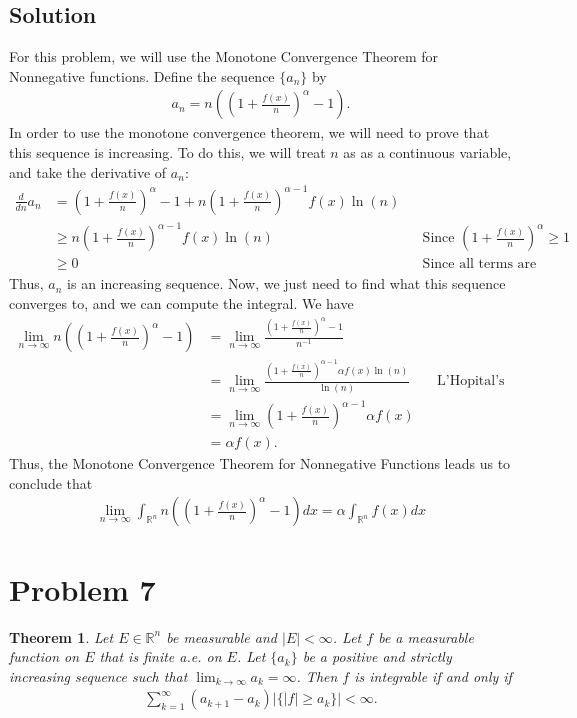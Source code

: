 \documentclass[10pt,a4paper]{article}
\theoremstyle{theorem}
\newtheorem{theorem}{Theorem}
\theoremstyle{definition}
\begin{document}
\subsection*{Solution}
For this problem, we will use the Monotone Convergence Theorem for Nonnegative functions. Define the sequence $\{a_n \}$ by
\begin{align*}
a_n = n \left( \left( 1 + \frac{f(x)}{n} \right)^ \alpha - 1 \right).
\end{align*}
In order to use the monotone convergence theorem, we will need to prove that this sequence is increasing. To do this, we will treat $n$ as as a continuous variable, and take the derivative of $a_n$:
\begin{align*}
\frac{d}{dn}a_n &= \left( 1 + \frac{f(x)}{n} \right)^ \alpha - 1 + n\left( 1 + \frac{f(x)}{n} \right)^ {\alpha - 1} f(x) \ln(n)\\
&\geq n\left( 1 + \frac{f(x)}{n} \right)^ {\alpha - 1} f(x) \ln(n) && \text{Since } \left( 1 + \frac{f(x)}{n} \right)^ \alpha \geq 1\\
&\geq 0 &&\text{Since all terms are nonnegative}
\end{align*}
Thus, $a_n$ is an increasing sequence. Now, we just need to find what this sequence converges to, and we can compute the integral. We have
\begin{align*}
\lim_{n \to \infty} n \left( \left( 1 + \frac{f(x)}{n} \right)^ \alpha - 1 \right) &= \lim_{n \to \infty} \frac{\left( 1 + \frac{f(x)}{n} \right)^ \alpha - 1}{n^{-1}}\\
&= \lim_{n \to \infty} \frac{\left( 1 + \frac{f(x)}{n} \right)^{ \alpha - 1} \alpha f(x) \ln(n)}{\ln(n)} &&\text{L'Hopital's Rule}\\
&=  \lim_{n \to \infty} \left( 1 + \frac{f(x)}{n} \right)^{ \alpha - 1} \alpha f(x)\\
&= \alpha f(x).
\end{align*}
Thus, the Monotone Convergence Theorem for Nonnegative Functions leads us to conclude that
\begin{align*}
\lim_{n \to \infty} \int_{\mathbb{R}^n} n \left( \left( 1 + \frac{f(x)}{n} \right)^ \alpha - 1 \right) dx = \alpha \int_{\mathbb{R}^n} f(x)dx
\end{align*}

\section*{Problem 7}
\begin{theorem}
Let $E \in \mathbb{R}^n$ be measurable and $|E| < \infty$. Let $f$ be a measurable function on $E$ that is finite a.e. on $E$. Let $\{a_k\}$ be a positive and strictly increasing sequence such that $\lim_{k \to \infty} a_k = \infty$. Then $f$ is integrable if and only if 
\begin{align*}
\sum_{k = 1}^\infty (a_{k + 1} - a_k)|\{|f| \geq a_k \}| < \infty.
\end{align*}
\end{theorem}
\end{document}
